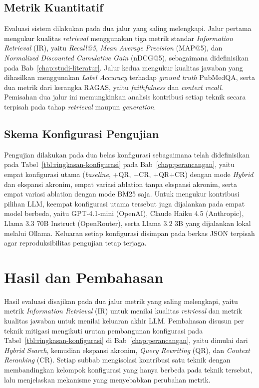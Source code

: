 \subsection{Metrik Kuantitatif}
\label{subsec:metrik-kuantitatif}

Evaluasi sistem dilakukan pada dua jalur yang saling melengkapi. Jalur pertama mengukur kualitas \textit{retrieval} menggunakan tiga metrik standar \textit{Information Retrieval} (IR), yaitu \textit{Recall@5}, \textit{Mean Average Precision} (MAP@5), dan \textit{Normalized Discounted Cumulative Gain} (nDCG@5), sebagaimana didefinisikan pada Bab~\ref{chap:studi-literatur}. Jalur kedua mengukur kualitas jawaban yang dihasilkan menggunakan \textit{Label Accuracy} terhadap \textit{ground truth} PubMedQA, serta dua metrik dari kerangka RAGAS, yaitu \textit{faithfulness} dan \textit{context recall}. Pemisahan dua jalur ini memungkinkan analisis kontribusi setiap teknik secara terpisah pada tahap \textit{retrieval} maupun \textit{generation}.

\subsection{Skema Konfigurasi Pengujian}
\label{subsec:skema-konfigurasi-pengujian}

Pengujian dilakukan pada dua belas konfigurasi sebagaimana telah didefinisikan pada Tabel~\ref{tbl:ringkasan-konfigurasi} pada Bab~\ref{chap:perancangan}, yaitu empat konfigurasi utama (\textit{baseline}, +QR, +CR, +QR+CR) dengan mode \textit{Hybrid} dan ekspansi akronim, empat variasi ablation tanpa ekspansi akronim, serta empat variasi ablation dengan mode BM25 saja. Untuk mengukur kontribusi pilihan LLM, keempat konfigurasi utama tersebut juga dijalankan pada empat model berbeda, yaitu GPT-4.1-mini (OpenAI), Claude Haiku 4.5 (Anthropic), Llama 3.3 70B Instruct (OpenRouter), serta Llama 3.2 3B yang dijalankan lokal melalui Ollama. Keluaran setiap konfigurasi disimpan pada berkas JSON terpisah agar reproduksibilitas pengujian tetap terjaga.

\section{Hasil dan Pembahasan}
\label{sec:hasil-evaluasi}

Hasil evaluasi disajikan pada dua jalur metrik yang saling melengkapi, yaitu metrik \textit{Information Retrieval} (IR) untuk menilai kualitas \textit{retrieval} dan metrik kualitas jawaban untuk menilai keluaran akhir LLM. Pembahasan disusun per teknik mitigasi mengikuti urutan pembangunan konfigurasi pada Tabel~\ref{tbl:ringkasan-konfigurasi} di Bab~\ref{chap:perancangan}, yaitu dimulai dari \textit{Hybrid Search}, kemudian ekspansi akronim, \textit{Query Rewriting} (QR), dan \textit{Context Reranking} (CR). Setiap subbab mengisolasi kontribusi satu teknik dengan membandingkan kelompok konfigurasi yang hanya berbeda pada teknik tersebut, lalu menjelaskan mekanisme yang menyebabkan perubahan metrik.

